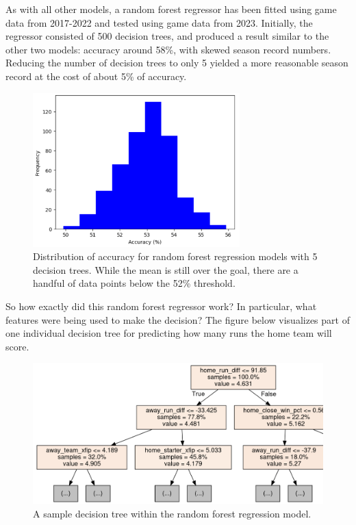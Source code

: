 \documentclass{paper}
\begin{document}
As with all other models, a random forest regressor has been fitted using game data from 2017-2022 and tested using game data from 2023. Initially, the regressor consisted of 500 decision trees, and produced a result similar to the other two models: accuracy around 58\%, with skewed season record numbers. Reducing the number of decision trees to only 5 yielded a more reasonable season record at the cost of about 5\% of accuracy.

\begin{figure}[H]
  \centering
  \includegraphics[width=8cm]{fig8}
  \caption{Distribution of accuracy for random forest regression models with 5 decision trees. While the mean is still over the goal, there are a handful of data points below the 52\% threshold.}
\end{figure}

So how exactly did this random forest regressor work? In particular, what features were being used to make the decision? The figure below visualizes part of one individual decision tree for predicting how many runs the home team will score.

\begin{figure}[H]
  \centering
  \includegraphics[width=13cm]{fig9}
  \caption{A sample decision tree within the random forest regression model.}
\end{figure}
\end{document}
